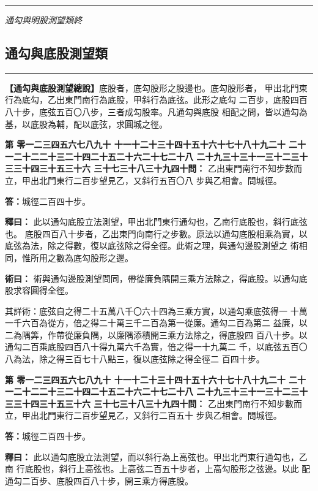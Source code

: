 \documentclass[11pt,a4paper]{article}
\newcommand{\longline}{\noindent\rule{\textwidth}{0.4pt}}
\newcounter{probnum}
\newcommand{\chnum}[1]{%
  \ifcase#1 零\or 一\or 二\or 三\or 四\or 五\or 六\or 七\or 八\or 九\or 十\or
    十一\or 十二\or 十三\or 十四\or 十五\or 十六\or 十七\or 十八\or 十九\or 二十\or
    二十一\or 二十二\or 二十三\or 二十四\or 二十五\or 二十六\or 二十七\or 二十八\or
    二十九\or 三十\or 三十一\or 三十二\or 三十三\or 三十四\or 三十五\or 三十六\or
    三十七\or 三十八\or 三十九\or 四十\fi}
\newcommand{\problem}[1]{\stepcounter{probnum}\par\noindent\textbf{第\chnum{\value{probnum}}問：}#1\par}
\newcommand{\answer}[1]{\par\noindent\textbf{答：}#1\par}
\newcommand{\shiyi}[1]{\par\noindent\textbf{釋曰：}#1\par}
\newcommand{\shuyue}[1]{\par\noindent\textbf{術曰：}#1\par}
\begin{document}
\vspace{0.5cm}
\longline
\begin{center}
\textit{通勾與明股測望類終}
\end{center}

\newpage
\setcounter{probnum}{0}

\subsection*{通勾與底股測望類}
\vspace{0.3cm}
\longline
\vspace{0.3cm}

\noindent
\textbf{【通勾與底股測望總說】}底股者，底勾股形之股邊也。底勾股形者，
甲出北門東行為底勾，乙出東門南行為底股，甲斜行為底弦。此形之底勾
二百步，底股四百八十步，底弦五百〇八步，三者成勾股率。凡通勾與底股
相配之問，皆以通勾為基，以底股為輔，配以底弦，求圓城之徑。

\problem{
乙出東門南行不知步數而立，甲出北門東行二百步望見乙，又斜行五百〇八
步與乙相會。問城徑。
}

\answer{城徑二百四十步。}

\shiyi{
此以通勾底股立法測望，甲出北門東行通勾也，乙南行底股也，斜行底弦也。
底股四百八十步者，乙出東門向南行之步數。原法以通勾底股相乘為實，以
底弦為法，除之得數，復以底弦除之得全徑。此術之理，與通勾邊股測望之
術相同，惟所用之數為底勾股形之邊。
}

\shuyue{
術與通勾邊股測望問同，帶從廉負隅開三乘方法除之，得底股。以通勾底
股求容圓得全徑。

其詳術：底弦自之得二十五萬八千〇六十四為三乘方實，以通勾乘底弦得一
十萬一千六百為從方，倍之得二十萬三千二百為第一從廉。通勾二百為第二
益廉，以二為隅筭，作帶從廉負隅，以廉隅添積開三乘方法除之，得底股四
百八十步。以通勾二百乘底股四百八十得九萬六千為實，倍之得一十九萬二
千，以底弦五百〇八為法，除之得三百七十八點三，復以底弦除之得全徑二
百四十步。
}

\vspace{0.3cm}
\problem{
乙出東門南行不知步數而立，甲出北門東行二百步望見乙，又斜行二百五十
步與乙相會。問城徑。
}

\answer{城徑二百四十步。}

\shiyi{
此以通勾底股立法測望，而以斜行為上高弦也。甲出北門東行通勾也，乙南
行底股也，斜行上高弦也。上高弦二百五十步者，上高勾股形之弦邊。以此
配通勾二百步、底股四百八十步，開三乘方得底股。
}
\end{document}
